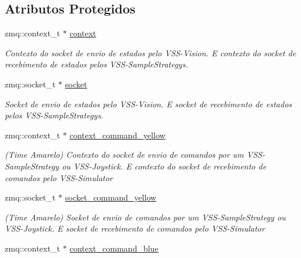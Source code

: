 \subsection*{Atributos Protegidos}
\begin{DoxyCompactItemize}
\item 
zmq\+::context\+\_\+t $\ast$ \hyperlink{classInterface_a7a2bda6046550893e9454930636e76d5}{context}\hypertarget{classInterface_a7a2bda6046550893e9454930636e76d5}{}\label{classInterface_a7a2bda6046550893e9454930636e76d5}

\begin{DoxyCompactList}\small\item\em Contexto do socket de envio de estados pelo V\+S\+S-\/\+Vision. E contexto do socket de recebimento de estados pelos V\+S\+S-\/\+Sample\+Strategys. \end{DoxyCompactList}\item 
zmq\+::socket\+\_\+t $\ast$ \hyperlink{classInterface_af38139f534f08df8b3dc9f29001e9584}{socket}\hypertarget{classInterface_af38139f534f08df8b3dc9f29001e9584}{}\label{classInterface_af38139f534f08df8b3dc9f29001e9584}

\begin{DoxyCompactList}\small\item\em Socket de envio de estados pelo V\+S\+S-\/\+Vision. E socket de recebimento de estados pelos V\+S\+S-\/\+Sample\+Strategys. \end{DoxyCompactList}\item 
zmq\+::context\+\_\+t $\ast$ \hyperlink{classInterface_abb1e6fcc090f58ed9f8883584d7bed26}{context\+\_\+command\+\_\+yellow}\hypertarget{classInterface_abb1e6fcc090f58ed9f8883584d7bed26}{}\label{classInterface_abb1e6fcc090f58ed9f8883584d7bed26}

\begin{DoxyCompactList}\small\item\em (Time Amarelo) Contexto do socket de envio de comandos por um V\+S\+S-\/\+Sample\+Strategy ou V\+S\+S-\/\+Joystick. E contexto do socket de recebimento de comandos pelo V\+S\+S-\/\+Simulator \end{DoxyCompactList}\item 
zmq\+::socket\+\_\+t $\ast$ \hyperlink{classInterface_a630819943a79e9f0ce39b7a8147828b5}{socket\+\_\+command\+\_\+yellow}\hypertarget{classInterface_a630819943a79e9f0ce39b7a8147828b5}{}\label{classInterface_a630819943a79e9f0ce39b7a8147828b5}

\begin{DoxyCompactList}\small\item\em (Time Amarelo) Socket de envio de comandos por um V\+S\+S-\/\+Sample\+Strategy ou V\+S\+S-\/\+Joystick. E socket de recebimento de comandos pelo V\+S\+S-\/\+Simulator \end{DoxyCompactList}\item 
zmq\+::context\+\_\+t $\ast$ \hyperlink{classInterface_a3beb279c04dc743f55939597efd85668}{context\+\_\+command\+\_\+blue}\hypertarget{classInterface_a3beb279c04dc743f55939597efd85668}{}\label{classInterface_a3beb279c04dc743f55939597efd85668}


\end{DoxyCompactItemize}
